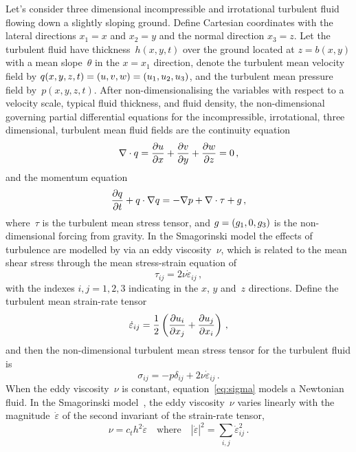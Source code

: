 \documentclass[a5paper,12pt]{article}
\newcommand{\ros}{{\dot\varepsilon}}
\renewcommand{\vec}[1]{\text{\boldmath$#1$}}
\begin{document}
Let's consider three dimensional incompressible and irrotational turbulent fluid flowing down a slightly sloping ground. 
Define Cartesian coordinates with the lateral directions $x_1=x$ and $x_2=y$ and the normal direction $x_3=z$. 
Let the turbulent fluid have thickness~$h(x,y,t)$ over the ground located at $z=b(x,y)$ with a mean slope~$\theta$ in the $x=x_1$ direction, denote the turbulent mean velocity field by $\vec q(x,y,z,t)=(u,v,w)=(u_1,u_2,u_3)$, and the turbulent mean pressure field by~$p(x,y,z,t)$.
After non-dimensionalising the variables with respect to a velocity scale, typical fluid thickness, and fluid density, the non-dimensional governing partial differential equations for the incompressible, irrotational, three dimensional, turbulent mean fluid fields are the continuity equation
\begin{equation}
    \divv\vec q=\D xu+\D yv+\D zw=0\,,\label{eq:cont}
\end{equation}
and the momentum equation
\begin{equation}
    \D t{\vec q} +\vec q\cdot\grad\vec q
    =-\grad p +\divv\tau +\vec{g}\,,\label{eq:mom}
\end{equation}
where~$\tau$ is the turbulent mean stress tensor, and $\vec g=(g_1,0,g_3)$ is the non-dimensional forcing from gravity.
In the Smagorinski model the effects of turbulence are modelled by via an eddy viscosity~$\nu$, which is related to the mean shear stress through the mean stress-strain equation of
\begin{equation}
\tau_{ij}=2\nu\ros_{ij}\,,\label{eq:tau}
\end{equation}
with the indexes $i,j=1,2,3$ indicating in the $x$, $y$ and~$z$ directions.
Define the turbulent mean strain-rate tensor~\cite[e.g.]{Roberts2008,Georgiev2008}
\begin{equation}
	\ros_{ij} =\frac12\left( \D{x_j}{u_i} +\D{x_i}{u_j}\right) \,,\label{eq:strainrate}
\end{equation}
and then the non-dimensional turbulent mean stress tensor for the turbulent fluid is
\begin{equation}
\sigma_{ij}=-p\delta_{ij}+2\nu\ros_{ij}\,.\label{eq:sigma}
\end{equation}
When the eddy viscosity~$\nu$ is constant, equation~\eqref{eq:sigma} models a Newtonian fluid.
In the Smagorinski model~\cite[e.g.]{Ozgokmen2007a}, the eddy viscosity~$\nu$ varies linearly with the magnitude~$\ros$ of the second invariant of the strain-rate tensor,
\begin{equation}
  \nu=c_th^2\ros\quad\text{where}\quad |\ros|^2=\sum_{i,j}\ros_{ij}^2\,.\label{eq:nu}
\end{equation}
\end{document}

